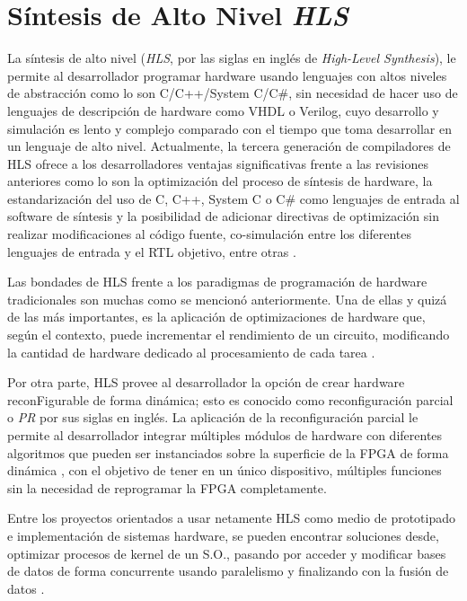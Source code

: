 \section{Síntesis de Alto Nivel \textit{HLS}}

La síntesis de alto nivel (\textit{HLS}, por las siglas en inglés de \textit{High-Level Synthesis}), le permite al desarrollador programar hardware usando lenguajes con altos niveles de abstracción como lo son C/C++/System C/C\#, sin necesidad de hacer uso de lenguajes de descripción de hardware como VHDL o Verilog, cuyo desarrollo y simulación es lento y complejo comparado con el tiempo que toma desarrollar en un lenguaje de alto nivel. Actualmente, la tercera generación de compiladores de HLS ofrece a los desarrolladores ventajas significativas frente a las revisiones anteriores como lo son la optimización del proceso de síntesis de hardware, la estandarización del uso de C, C++, System C o C\# como lenguajes de entrada al software de síntesis y la posibilidad de adicionar directivas de optimización sin realizar modificaciones al código fuente, co-simulación entre los diferentes lenguajes de entrada y el RTL objetivo, entre otras \cite{HLStory}.

Las bondades de HLS frente a los paradigmas de programación de hardware tradicionales son muchas como se mencionó anteriormente. Una de ellas y quizá de las más importantes, es la aplicación de optimizaciones de hardware que, según el contexto, puede incrementar el rendimiento de un circuito, modificando la cantidad de hardware dedicado al procesamiento de cada tarea \cite{HLSeffect,canis2013legup}. 

Por otra parte, HLS provee al desarrollador la opción de crear hardware reconFigurable de forma dinámica; esto es conocido como reconfiguración parcial o \textit{PR} por sus siglas en inglés. La aplicación de la reconfiguración parcial le permite al desarrollador integrar múltiples módulos de hardware con diferentes algoritmos que pueden ser instanciados sobre la superficie de la FPGA de forma dinámica \citep{kao2005benefits,wehner2014using,owens2013design}, con el objetivo de tener en un único dispositivo, múltiples funciones sin la necesidad de reprogramar la FPGA completamente.

Entre los proyectos orientados a usar netamente HLS como medio de prototipado e implementación de sistemas hardware, se pueden encontrar soluciones desde, optimizar procesos de kernel de un S.O., pasando por acceder y modificar bases de datos de forma concurrente usando paralelismo y finalizando con la fusión de datos  \citep{liu2013soft,monson2015using,navarro2013high,malazgirt2015high,choi2013software,alias2013optimizing,zhao2015area,liu2015moving}.

